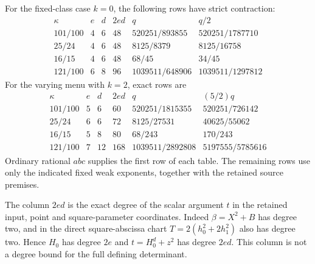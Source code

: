 \documentclass[11pt,a4paper]{article}
\begin{document}
For the fixed-class case $k=0$, the following rows have strict
contraction:
\[
\begin{array}{c|c|c|c|c|c}
\kappa&e&d&2ed&q&q/2\\\hline
101/100&4&6&48&520251/893855&520251/1787710\\
25/24&4&6&48&8125/8379&8125/16758\\
16/15&4&6&48&68/45&34/45\\
121/100&6&8&96&1039511/648906&1039511/1297812
\end{array}
\]
For the varying menu with $k=2$, exact rows are
\[
\begin{array}{c|c|c|c|c|c}
\kappa&e&d&2ed&q&(5/2)q\\\hline
101/100&5&6&60&520251/1815355&520251/726142\\
25/24&6&6&72&8125/27531&40625/55062\\
16/15&5&8&80&68/243&170/243\\
121/100&7&12&168&1039511/2892808&5197555/5785616
\end{array}
\]
Ordinary rational $abc$ supplies the first row of each table.
The remaining rows use only the indicated fixed weak exponents,
together with the retained source premises.

The column $2ed$ is the exact degree of the scalar argument $t$ in
the retained input, point and square-parameter coordinates. Indeed
$\beta=X^2+B$ has degree two, and in the direct square-abscissa
chart $T=2(h_0^2+2h_1^2)$ also has degree two. Hence $H_0$ has
degree $2e$ and $t=H_0^d+z^2$ has degree $2ed$. This column is
not a degree bound for the full defining determinant.
\end{document}
